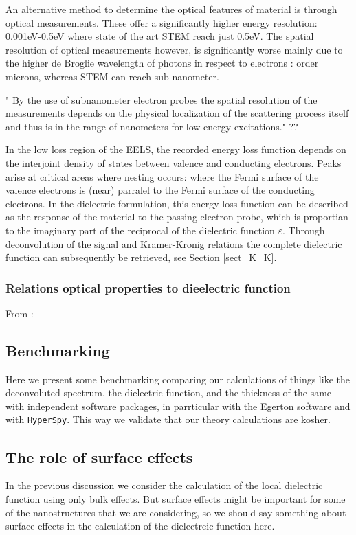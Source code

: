 An alternative method to determine the optical features of material is through optical measurements. These offer a significantly higher energy resolution: 0.001eV-0.5eV where state of the art STEM reach just 0.5eV. The spatial resolution of optical measurements however, is significantly worse mainly due to the higher de Broglie wavelength of photons in respect to electrons \cite{iets}: order microns, whereas STEM can reach sub nanometer.


"
By the use of subnanometer electron probes the spatial resolution of the measurements depends on the physical localization of the scattering process itself and thus is in the range of nanometers for low energy excitations." ?? 


In the low loss region of the EELS, the recorded energy loss function depends on the interjoint density of states between valence and conducting electrons. Peaks arise at critical areas where nesting occurs: where the Fermi surface of the valence electrons is (near) parralel to the Fermi surface of the conducting electrons. In the dielectric formulation, this energy loss function can be described as the response of the material to the passing electron probe, which is proportian to the imaginary part of the reciprocal of the dielectric function $\varepsilon$. Through deconvolution of the signal and Kramer-Kronig relations the complete dielectric function can subsequently be retrieved, see Section \ref{sect_K_K}.





\subsubsection{Relations optical properties to dieelectric function}
From \cite{brockt_lakner_2000}:



\subsection{Benchmarking}

Here we present some benchmarking comparing our calculations of things like the
deconvoluted spectrum, the dielectric function, and the thickness of
the same with independent software packages, in parrticular with
the Egerton software and with {\tt HyperSpy}. This way we validate that
our theory calculations are kosher.

\subsection{The role of surface effects}

In the previous discussion we consider the calculation of the local dielectric function
using only bulk effects.
But surface effects might be important for some of the nanostructures that
we are considering, so we should say something about surface effects
in the calculation of the dielectreic function here.
